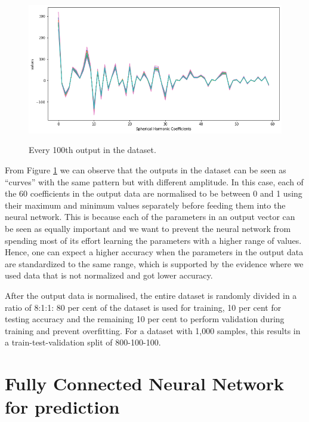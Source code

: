 \begin{figure}[H]
    \centering
    \caption{Every 100th output in the dataset.}
    \includegraphics[scale=0.5]{figures/geoid_images/Geoid_sample_output.png}
    \label{figure:geoid_output}
\end{figure}

From Figure \ref{figure:geoid_output} we can observe that the outputs in the dataset can be seen as ``curves'' with the same pattern but with different amplitude. In this case, each of the 60 coefficients in the output data are normalised to be between 0 and 1 using their maximum and minimum values separately before feeding them into the neural network. This is because each of the parameters in an output vector can be seen as equally important and we want to prevent the neural network from spending most of its effort learning the parameters with a higher range of values. Hence, one can expect a higher accuracy when the parameters in the output data are standardized to the same range, which is supported by the evidence where we used data that is not normalized and got lower accuracy.

After the output data is normalised, the entire dataset is randomly divided in a ratio of 8:1:1: 80 per cent of the dataset is used for training, 10 per cent for testing accuracy and the remaining 10 per cent to perform validation during training and prevent overfitting. For a dataset with 1,000 samples, this results in a train-test-validation split of 800-100-100.

\section{Fully Connected Neural Network for prediction}

